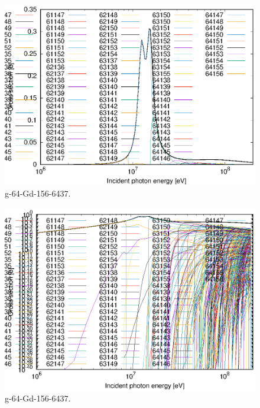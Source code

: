 \begin{figure}
 \includegraphics[width=\linewidth]{eps/g_64-Gd-156_6437.eps}
  \caption{g-64-Gd-156-6437.}
\end{figure}
\begin{figure}
 \includegraphics[width=\linewidth]{eps-log/g_64-Gd-156_6437.eps}
 \caption{g-64-Gd-156-6437.}
\end{figure}
\newpage \clearpage


